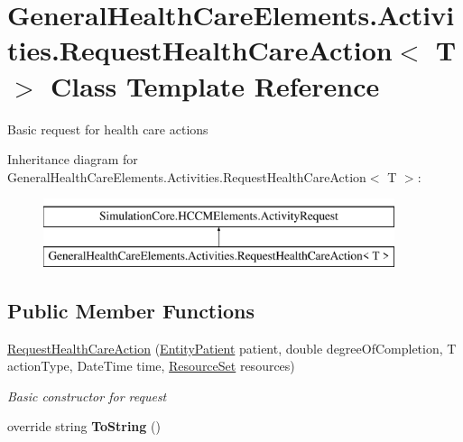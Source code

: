 \hypertarget{class_general_health_care_elements_1_1_activities_1_1_request_health_care_action}{}\section{General\+Health\+Care\+Elements.\+Activities.\+Request\+Health\+Care\+Action$<$ T $>$ Class Template Reference}
\label{class_general_health_care_elements_1_1_activities_1_1_request_health_care_action}


Basic request for health care actions  


Inheritance diagram for General\+Health\+Care\+Elements.\+Activities.\+Request\+Health\+Care\+Action$<$ T $>$\+:\begin{figure}[H]
\begin{center}
\leavevmode
\includegraphics[height=2.000000cm]{class_general_health_care_elements_1_1_activities_1_1_request_health_care_action}
\end{center}
\end{figure}
\subsection*{Public Member Functions}
\begin{DoxyCompactItemize}
\item 
\hyperlink{class_general_health_care_elements_1_1_activities_1_1_request_health_care_action_ad7132918e1381184247bd05d7e2d8b0e}{Request\+Health\+Care\+Action} (\hyperlink{class_general_health_care_elements_1_1_entities_1_1_entity_patient}{Entity\+Patient} patient, double degree\+Of\+Completion, T action\+Type, Date\+Time time, \hyperlink{class_general_health_care_elements_1_1_resource_handling_1_1_resource_set}{Resource\+Set} resources)
\begin{DoxyCompactList}\small\item\em Basic constructor for request \end{DoxyCompactList}\item 
override string {\bfseries To\+String} ()\hypertarget{class_general_health_care_elements_1_1_activities_1_1_request_health_care_action_a8028b55ff2837e3eab9cb159aefe0b5a}{}\label{class_general_health_care_elements_1_1_activities_1_1_request_health_care_action_a8028b55ff2837e3eab9cb159aefe0b5a}

\end{DoxyCompactItemize}
